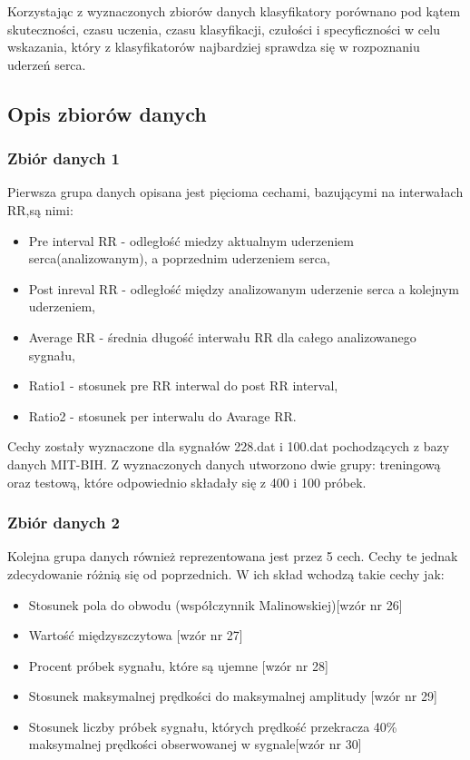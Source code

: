 \documentclass[[10pt,a4paper]{article}
\begin{document}
Korzystając z wyznaczonych zbiorów danych klasyfikatory porównano pod kątem skuteczności, czasu uczenia, czasu klasyfikacji, czułości i specyficzności w celu wskazania, który z klasyfikatorów najbardziej sprawdza się w rozpoznaniu uderzeń serca. 

\subsection{Opis zbiorów danych}
\subsubsection{Zbiór danych 1}
Pierwsza grupa danych opisana jest pięcioma cechami, bazującymi na interwałach RR,są nimi:
\begin{itemize}
\item Pre interval RR - odległość miedzy aktualnym uderzeniem serca(analizowanym), a poprzednim uderzeniem serca,
\item Post inreval RR  - odległość między analizowanym uderzenie serca a kolejnym uderzeniem,
\item Average RR - średnia długość interwału RR dla całego analizowanego sygnału,
\item Ratio1 - stosunek pre RR interwal do post RR interval,
\item Ratio2 - stosunek per interwalu do Avarage RR.
\end{itemize}

Cechy zostały wyznaczone dla sygnałów 228.dat i 100.dat pochodzących z bazy danych MIT-BIH. Z wyznaczonych danych utworzono dwie grupy: treningową oraz testową, które odpowiednio składały się z 400 i 100 próbek. 

\subsubsection{Zbiór danych 2}
Kolejna grupa danych również reprezentowana jest przez 5 cech. Cechy te jednak zdecydowanie różnią się od poprzednich. W ich skład wchodzą takie cechy jak:

\begin{itemize}
	\item{Stosunek pola do obwodu (współczynnik Malinowskiej)[wzór nr 26]}
	
	\item{Wartość międzyszczytowa [wzór nr 27]}
	
	\item{Procent próbek sygnału, które są ujemne [wzór nr 28]}
	
	\item{Stosunek maksymalnej prędkości do maksymalnej amplitudy [wzór nr 29]}
	
	\item{Stosunek liczby próbek sygnału, których prędkość przekracza 40\% maksymalnej prędkości obserwowanej w sygnale[wzór nr 30]}
	
\end{itemize}
\end{document}
